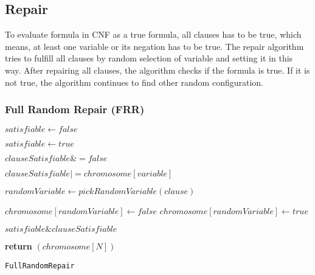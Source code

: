 \documentclass{article}
\begin{document}
	\subsection{Repair}
		
		To evaluate formula in CNF as a true formula, all clauses has to be true, which means, at least one variable or its negation has to be true. The repair algorithm tries to fulfill all clauses by random selection of variable and setting it in this way. After repairing all clauses, the algorithm checks if the formula is true. If it is not true, the algorithm continues to find other random configuration.

		\subsubsection{Full Random Repair (FRR)}
		\begin{center}
			\begin{minipage}{1\linewidth} %
				\begin{algorithm}[H]
					\hrulefill
					\medskip

					$satisfiable \gets false$

					 {
						$satisfiable \gets true$

						 {
							$clauseSatisfiable \&= false$

							 {
								 {
									$clauseSatisfiable |= chromosome[variable]$
								}
							}

							 {
								$randomVariable \gets pickRandomVariable(clause)$

								 {
									$chromosome[randomVariable] \gets false$
								}
								 {
									$chromosome[randomVariable] \gets true$
								}
							}
							$satisfiable \& clauseSatisfiable$
						}
					}
					{\bf return} $(chromosome[N])$ \;
					\caption{\texttt{FullRandomRepair}} %
					\label{alg:FullRandomRepair}   %
				\end{algorithm}
			\end{minipage}
		\end{center}
\end{document}
